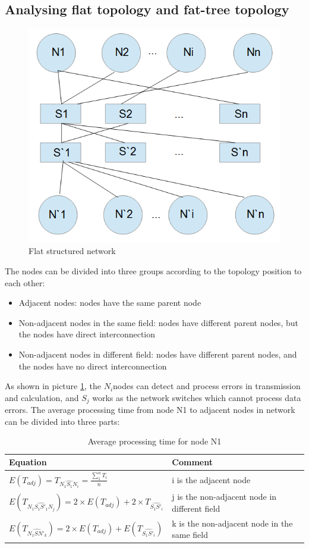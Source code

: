 \documentclass[11pt,openright,a4paper]{report}
\begin{document}
\subsection{Analysing flat topology and fat-tree topology}
\begin{figure}[H]
	\centering
    \includegraphics[width=0.4\linewidth]{picture/FlatStruct.PNG}
    \caption{Flat structured network}
    \label{fig:flat}
\end{figure}
The nodes can be divided into three groups according to the topology position to each other:
\begin{itemize}
	\item Adjacent nodes: nodes have the same parent node
    \item Non-adjacent nodes in the same field: nodes have different parent nodes, but the nodes have direct interconnection
    \item Non-adjacent nodes in different field: nodes have different parent nodes, and the nodes have no direct interconnection
\end{itemize}
As shown in picture \ref{fig:flat}, the $N_{i}$nodes can detect and process errors in transmission and calculation, and $S_{j}$ works as the network switches which cannot process data errors. The average processing time from node N1 to adjacent nodes in network can be divided into three parts:\\
\begin{table}[H]
\centering
\caption{Average processing time for node N1}
\label{tab:n1proc}
\begin{tabular}{@{}ll@{}}
\toprule
Equation                                                                                          & Comment                                       \\ \midrule
$E(T_{adj})=T_{\widehat{N_{1}S_{1}N_{i}}}=\frac{\sum_{1}^{n}T_{i}}{n}$                            & i is the adjacent node                        \\
$E(T_{\widehat{N_{1}S_{1}{S}'_{1}N_{j}}})=2\times E(T_{adj})+2\times T_{\widehat{S_{1}{S}'_{i}}}$ & j is the non-adjacent node in different field  \\
$E(T_{\widehat{N_{1}S{N}'_{k}}})=2\times E(T_{adj})+E(T_{\widehat{S_{1}{S}'_{i}}})$          & k is the non-adjacent node in the same field \\ \bottomrule
\end{tabular}
\end{table}
\end{document}
